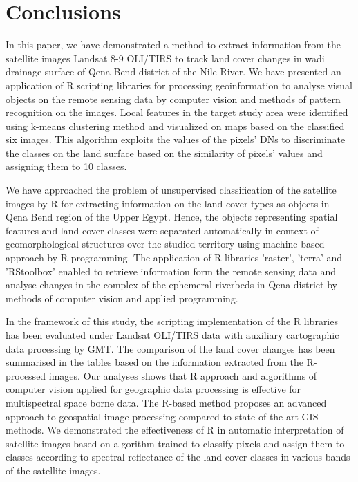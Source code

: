 \documentclass[information,article,submit,pdftex,moreauthors]{Definitions/mdpi}
\begin{document}
\section{Conclusions}
In this paper, we have demonstrated a method to extract information  from the satellite images Landsat 8-9 OLI/TIRS to track land cover changes in wadi drainage surface of Qena Bend district of the Nile River. We have presented an application of R scripting libraries for processing geoinformation to analyse visual objects on the remote sensing data by computer vision and methods of pattern recognition on the images. Local features in the target study area were identified using k-means clustering method and visualized on maps based on the classified six images. This algorithm exploits the values of the pixels' DNs to discriminate the classes on the land surface based on the similarity of pixels' values and assigning them to 10 classes. 

We have approached the problem of unsupervised classification of the satellite images by R for extracting information on the land cover types as objects in Qena Bend region of the Upper Egypt. Hence, the objects representing spatial features and land cover classes were separated automatically in context of geomorphological structures over the studied territory using machine-based approach by R programming. The application of R libraries 'raster', 'terra' and 'RStoolbox' enabled to retrieve information form the remote sensing data and analyse changes in the complex of the ephemeral riverbeds in Qena district by methods of computer vision and applied programming.

In the framework of this study, the scripting implementation of the R libraries has been evaluated under Landsat OLI/TIRS data with auxiliary cartographic data processing by GMT. The comparison of the land cover changes has been summarised in the tables based on the information extracted from the R-processed images. Our analyses shows that R approach and algorithms of computer vision applied for geographic data processing is effective for multispectral space borne data. The R-based method proposes an advanced approach to geospatial image processing compared to state of the art GIS methods. We demonstrated the effectiveness of R in automatic interpretation of satellite images based on algorithm trained to classify pixels and assign them to classes according to spectral reflectance of the land cover classes in various bands of the satellite images. 
\end{document}
